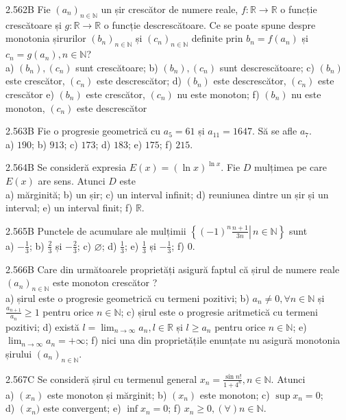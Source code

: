 \documentclass[11pt]{article}
\begin{document}
2.562B Fie $\left(a_{n}\right)_{n \in \mathbb{N}}$ un șir crescător de numere reale, $f: \mathbb{R} \rightarrow \mathbb{R}$ o funcție crescătoare și $g: \mathbb{R} \rightarrow \mathbb{R}$ o funcție descrescătoare. Ce se poate spune despre monotonia șirurilor $\left(b_{n}\right)_{n \in \mathbb{N}}$ și $\left(c_{n}\right)_{n \in \mathbb{N}}$ definite prin $b_{n}=f\left(a_{n}\right)$ și $c_{n}=g\left(a_{n}\right), n \in \mathbb{N}$?\\ a) $\left(b_{n}\right),\left(c_{n}\right)$ sunt crescătoare; b) $\left(b_{n}\right),\left(c_{n}\right)$ sunt descrescătoare; c) $\left(b_{n}\right)$ este crescător, $\left(c_{n}\right)$ este descrescător; d) $\left(b_{n}\right)$ este descrescător, $\left(c_{n}\right)$ este crescător e) $\left(b_{n}\right)$ este crescător, $\left(c_{n}\right)$ nu este monoton; f) $\left(b_{n}\right)$ nu este monoton, $\left(c_{n}\right)$ este descrescător

2.563B Fie o progresie geometrică cu $a_{5}=61$ și $a_{11}=1647$. Să se afle $a_{7}$.\\ a) $190$; b) $913$; c) $173$; d) $183$; e) $175$; f) $215$.

2.564B Se consideră expresia $E(x)=(\ln x)^{\ln x}$. Fie $D$ mulțimea pe care $E(x)$ are sens. Atunci $D$ este\\ a) mărginită; b) un șir; c) un interval infinit; d) reuniunea dintre un șir și un interval; e) un interval finit; f) $\mathbb{R}$.

2.565B Punctele de acumulare ale mulțimii $\left\{\left.(-1)^{n} \frac{n+1}{3 n} \right\rvert\, n \in \mathbb{N}\right\}$ sunt\\ a) $-\frac{1}{3}$; b) $\frac{2}{3}$ și $-\frac{2}{3}$; c) $\varnothing$; d) $\frac{1}{3}$; e) $\frac{1}{3}$ și $-\frac{1}{3}$; f) $0$.

2.566B Care din următoarele proprietăți asigură faptul că șirul de numere reale $\left(a_{n}\right)_{n \in \mathbb{N}}$ este monoton crescător ?\\ a) șirul este o progresie geometrică cu termeni pozitivi; b) $a_{n} \neq 0, \forall n \in \mathbb{N}$ și $\frac{a_{n+1}}{a_{n}} \geq 1$ pentru orice $n \in \mathbb{N}$; c) șirul este o progresie aritmetică cu termeni pozitivi; d) există $l=\lim _{n \rightarrow \infty} a_{n}, l \in \mathbb{R}$ și $l \geq a_{n}$ pentru orice $n \in \mathbb{N}$; e) $\lim _{n \rightarrow \infty} a_{n}=+\infty$; f) nici una din proprietățile enunțate nu asigură monotonia șirului $\left(a_{n}\right)_{n \in \mathbb{N}}$.

2.567C Se consideră șirul cu termenul general $x_{n}=\frac{\sin n!}{1+4^{n}}, n \in \mathbb{N}$. Atunci\\ a) $(x_{n})$ este monoton și mărginit; b) $\left(x_{n}\right)$ este monoton; c) $\sup x_{n}=0$;\\ d) $\left(x_{n}\right.)$ este convergent; e) $\inf x_{n}=0$; f) $x_{n} \geq 0,(\forall) n \in \mathbb{N}$.
\end{document}

